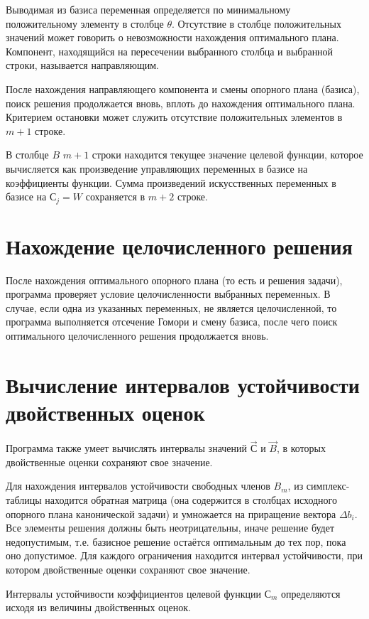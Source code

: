 Выводимая из базиса переменная определяется по минимальному положительному элементу в столбце  $\theta$. Отсутствие в столбце положительных значений может говорить о невозможности нахождения оптимального плана. Компонент, находящийся на пересечении выбранного столбца и выбранной строки, называется направляющим.

После нахождения направляющего компонента и смены опорного плана (базиса), поиск решения продолжается вновь, вплоть до нахождения оптимального плана. Критерием остановки может служить отсутствие положительных элементов в $m+1$ строке.

В столбце $B$ $m+1$ строки находится текущее значение целевой функции, которое вычисляется как произведение управляющих переменных в базисе на коэффициенты функции. Сумма произведений искусственных переменных в базисе на $С_j = W$ сохраняется в $m+2$ строке.

\section{Нахождение целочисленного решения}

После нахождения оптимального опорного плана (то есть и решения задачи), программа проверяет условие целочисленности выбранных переменных. В случае, если одна из указанных переменных, не является целочисленной, то программа выполняется отсечение Гомори и смену базиса, после чего поиск оптимального целочисленного решения продолжается вновь.

\section{Вычисление интервалов устойчивости двойственных оценок}
Программа также умеет вычислять интервалы значений $\vec{С}$ и $\vec{B}$, в которых двойственные оценки сохраняют свое значение.

Для нахождения интервалов устойчивости свободных членов $B_m$, из симплекс-таблицы находится обратная матрица (она содержится в столбцах исходного опорного плана канонической задачи) и умножается на приращение вектора $\Delta b_i$. Все элементы решения должны быть неотрицательны, иначе решение будет недопустимым, т.е. базисное решение остаётся оптимальным до тех пор, пока оно допустимое. Для каждого ограничения находится интервал устойчивости, при котором двойственные оценки сохраняют свое значение.

Интервалы устойчивости коэффициентов целевой функции $С_m$ определяются исходя из величины двойственных оценок.